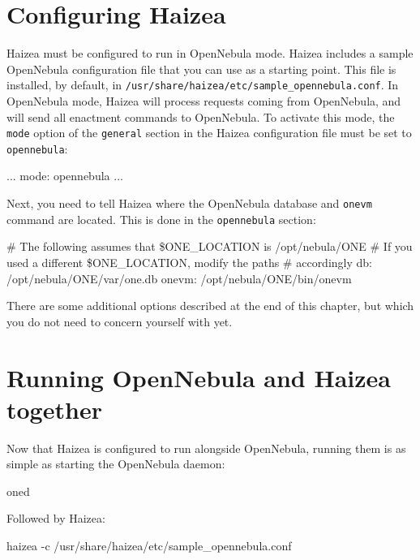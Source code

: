 \section{Configuring Haizea}

Haizea must be configured to run in OpenNebula mode. Haizea includes a sample OpenNebula configuration file that you can use as a starting point. This file is installed, by default, in \texttt{/usr/share/haizea/etc/sample\_opennebula.conf}. In OpenNebula mode, Haizea will process requests coming from OpenNebula, and will send all enactment commands to OpenNebula. To activate this mode, the \texttt{mode} option of the \texttt{general} section in the Haizea configuration file must be set to \texttt{opennebula}:

\begin{wideshellverbatim}
[general]
...
mode: opennebula
...
\end{wideshellverbatim}

Next, you need to tell Haizea where the OpenNebula database and \texttt{onevm} command are located. This is done in the \texttt{opennebula} section:

\begin{wideshellverbatim}
[opennebula]
# The following assumes that \$ONE_LOCATION is /opt/nebula/ONE
# If you used a different \$ONE_LOCATION, modify the paths 
# accordingly
db: /opt/nebula/ONE/var/one.db
onevm: /opt/nebula/ONE/bin/onevm
\end{wideshellverbatim}

There are some additional options described at the end of this chapter, but which you do not need to concern yourself with yet.

\section{Running OpenNebula and Haizea together}

Now that Haizea is configured to run alongside OpenNebula, running them is as simple as starting the OpenNebula daemon:

\begin{wideshellverbatim}
oned
\end{wideshellverbatim}

Followed by Haizea:

\begin{wideshellverbatim}
haizea -c /usr/share/haizea/etc/sample_opennebula.conf
\end{wideshellverbatim}

